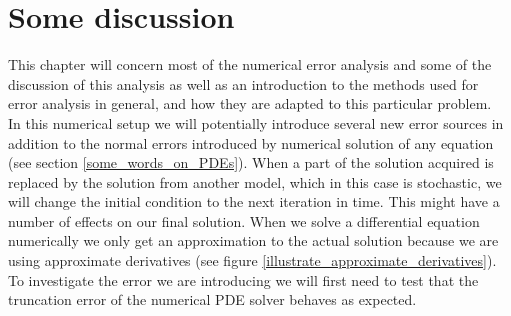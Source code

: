 \section{Some discussion}

This chapter will concern most of the numerical error analysis and some of the discussion of this analysis as well as an introduction to the methods used for error analysis in general, and how they are adapted to this particular problem.\\


In this numerical setup we will potentially introduce several new error sources in addition to the normal errors introduced by numerical solution of any equation (see section \ref{some_words_on_PDEs}). 
When a part of the solution acquired is replaced by the solution from another model, which in this case is stochastic, we will change the initial condition to the next iteration in time. 
This might have a number of effects on our final solution. 
When we solve a differential equation numerically we only get an approximation to the actual solution because we are using approximate derivatives (see figure \ref{illustrate_approximate_derivatives}). 
To investigate the error we are introducing we will first need to test that the truncation error of the numerical PDE solver behaves as expected. 

